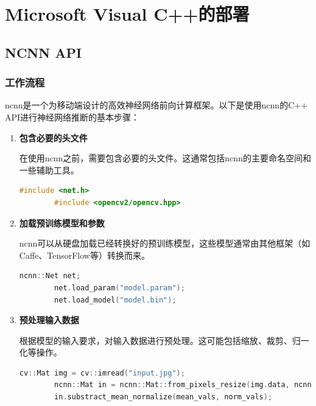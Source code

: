 \chapter{Microsoft Visual C++的部署}
\label{chapter:7}

\section{NCNN API}

\subsection{工作流程}

ncnn是一个为移动端设计的高效神经网络前向计算框架。以下是使用ncnn的C++ API进行神经网络推断的基本步骤：

\begin{enumerate}

	\item \textbf{包含必要的头文件}

	在使用ncnn之前，需要包含必要的头文件。这通常包括ncnn的主要命名空间和一些辅助工具。

	\begin{lstlisting}[caption={导入OpenCV与NCNN},language=C++]
		#include <net.h>
		#include <opencv2/opencv.hpp>
	\end{lstlisting}

	\item \textbf{加载预训练模型和参数}

	ncnn可以从硬盘加载已经转换好的预训练模型，这些模型通常由其他框架（如Caffe、TensorFlow等）转换而来。

	\begin{lstlisting}[caption={加载权重文件},language=C++]
		ncnn::Net net;
		net.load_param("model.param");
		net.load_model("model.bin");
	\end{lstlisting}

	\item \textbf{预处理输入数据}

	根据模型的输入要求，对输入数据进行预处理。这可能包括缩放、裁剪、归一化等操作。

	\begin{lstlisting}[caption={读取图片并处理数据},language=C++]
		cv::Mat img = cv::imread("input.jpg");
		ncnn::Mat in = ncnn::Mat::from_pixels_resize(img.data, ncnn::Mat::PIXEL_BGR, img.cols, img.rows, model_input_width, model_input_height);
		in.substract_mean_normalize(mean_vals, norm_vals);
	\end{lstlisting}


\end{enumerate}
